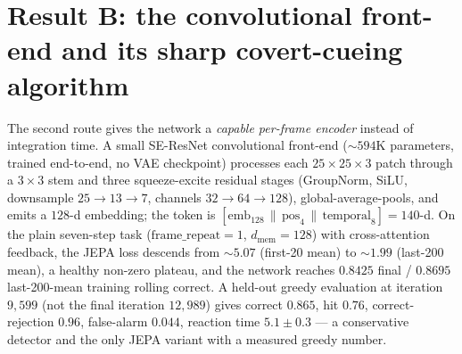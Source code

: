 \section{Result B: the convolutional front-end and its sharp covert-cueing algorithm}
\label{sec:jepa-resultB}
The second route gives the network a \emph{capable per-frame encoder} instead of integration
time. A small SE-ResNet convolutional front-end ($\sim594$K parameters, trained end-to-end,
no VAE checkpoint) processes each $25\times25\times3$ patch through a $3\times3$ stem and
three squeeze-excite residual stages (GroupNorm, SiLU, downsample $25\to13\to7$, channels
$32\to64\to128$), global-average-pools, and emits a $128$-d embedding; the token is
$[\text{emb}_{128}\,\|\,\text{pos}_4\,\|\,\text{temporal}_8]=140$-d. On the plain seven-step
task ($\text{frame\_repeat}=1$, $d_{\text{mem}}=128$) with cross-attention feedback, the JEPA
loss descends from $\sim5.07$ (first-20 mean) to $\sim1.99$ (last-200 mean), a healthy
non-zero plateau, and the network reaches $0.8425$ final / $0.8695$ last-200-mean training
rolling correct. A held-out greedy evaluation at iteration $9{,}599$ (not the final iteration
$12{,}989$) gives correct $0.865$, hit $0.76$, correct-rejection $0.96$, false-alarm
$0.044$, reaction time $5.1\pm0.3$ --- a conservative detector and the only JEPA variant with
a measured greedy number.

